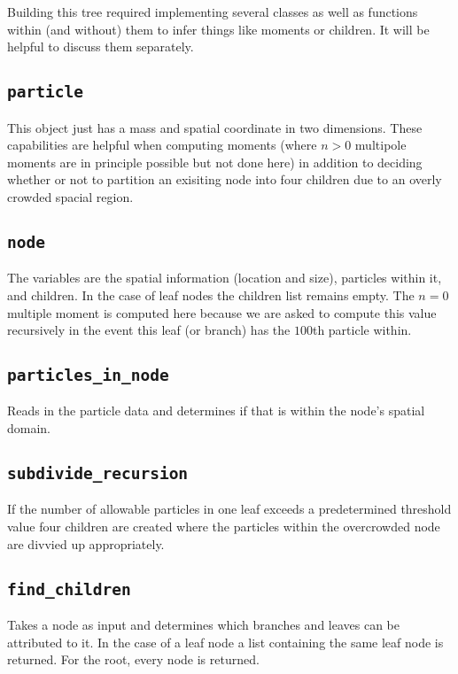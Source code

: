 Building this tree required implementing several classes as well as functions within (and without) them to infer things like moments or children. It will be helpful to discuss them separately.

\subsection*{\texttt{particle}}

This object just has a mass and spatial coordinate in two dimensions. These capabilities are helpful when computing moments (where $n > 0$ multipole moments are in principle possible but not done here) in addition to deciding whether or not to partition an exisiting node into four children due to an overly crowded spacial region.

\subsection*{\texttt{node}}

The variables are the spatial information (location and size), particles within it, and children. In the case of leaf nodes the children list remains empty. The $n=0$ multiple moment is computed here because we are asked to compute this value recursively in the event this leaf (or branch) has the $100$th particle within.

\subsection*{\texttt{particles\_in\_node}}

Reads in the particle data and determines if that is within the node's spatial domain.

\subsection*{\texttt{subdivide\_recursion}}

If the number of allowable particles in one leaf exceeds a predetermined threshold value four children are created where the particles within the overcrowded node are divvied up appropriately.

\subsection*{\texttt{find\_children}}

Takes a node as input and determines which branches and leaves can be attributed to it. In the case of a leaf node a list containing the same leaf node is returned. For the root, every node is returned.


